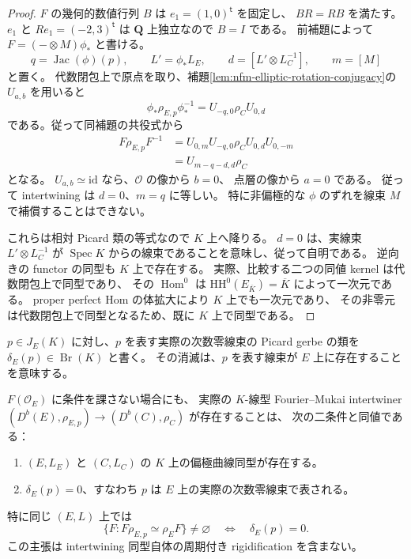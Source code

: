 \begin{proof}
$F$ の幾何的数値行列 $B$ は $e_1=(1,0)^{\mathsf t}$ を固定し、
$BR=RB$ を満たす。$e_1$ と $Re_1=(-2,3)^{\mathsf t}$ は
$\mathbf Q$ 上独立なので $B=I$ である。
前補題によって $F=(-\otimes M)\phi_*$ と書ける。
\[
 q=\operatorname{Jac}(\phi)(p),\qquad
 L'=\phi_*L_E,\qquad d=[L'\otimes L_C^{-1}],\qquad m=[M]
\]
と置く。
代数閉包上で原点を取り、補題\ref{lem:nfm-elliptic-rotation-conjugacy}の
$U_{a,b}$ を用いると
\[
 \phi_*\rho_{E,p}\phi_*^{-1}=U_{-q,0}\rho_CU_{0,d}
\]
である。従って同補題の共役式から
\begin{equation}\label{eq:nfm-elliptic-graph-conjugation}
 \begin{split}
 F\rho_{E,p}F^{-1}
 &=U_{0,m}U_{-q,0}\rho_CU_{0,d}U_{0,-m}\\
 &=U_{m-q-d,d}\rho_C
 \end{split}
\end{equation}
となる。
$U_{a,b}\simeq\mathrm{id}$ なら、$\mathcal O$ の像から $b=0$、
点層の像から $a=0$ である。
従って intertwining は $d=0$、$m=q$ に等しい。
特に非偏極的な $\phi$ のずれを線束 $M$ で補償することはできない。

これらは相対 Picard 類の等式なので $K$ 上へ降りる。
$d=0$ は、実線束 $L'\otimes L_C^{-1}$ が
$\operatorname{Spec}K$ からの線束であることを意味し、従って自明である。
逆向きの functor の同型も $K$ 上で存在する。
実際、比較する二つの同値 kernel は代数閉包上で同型であり、
その $\operatorname{Hom}^0$ は $\mathrm{HH}^0(E_{\overline K})=\overline K$
によって一次元である。
proper perfect Hom の体拡大により $K$ 上でも一次元であり、
その非零元は代数閉包上で同型となるため、既に $K$ 上で同型である。
\end{proof}

$p\in J_E(K)$ に対し、$p$ を表す実際の次数零線束の Picard gerbe の類を
$\delta_E(p)\in\operatorname{Br}(K)$ と書く。
その消滅は、$p$ を表す線束が $E$ 上に存在することを意味する。

\begin{corollary}
\label{cor:nfm-elliptic-any-intertwiner-criterion}
$F(\mathcal O_E)$ に条件を課さない場合にも、
実際の $K$-線型 Fourier--Mukai intertwiner
$(D^b(E),\rho_{E,p})\to(D^b(C),\rho_C)$ が存在することは、
次の二条件と同値である：
\begin{enumerate}
 \item $(E,L_E)$ と $(C,L_C)$ の $K$ 上の偏極曲線同型が存在する。
 \item $\delta_E(p)=0$、すなわち $p$ は $E$ 上の実際の次数零線束で表される。
\end{enumerate}
特に同じ $(E,L)$ 上では
\begin{equation}\label{eq:nfm-elliptic-any-intertwiner-obstruction}
 \{F:F\rho_{E,p}\simeq\rho_EF\}\ne\varnothing
 \quad\Longleftrightarrow\quad \delta_E(p)=0.
\end{equation}
この主張は intertwining 同型自体の周期付き rigidification を含まない。
\end{corollary}

